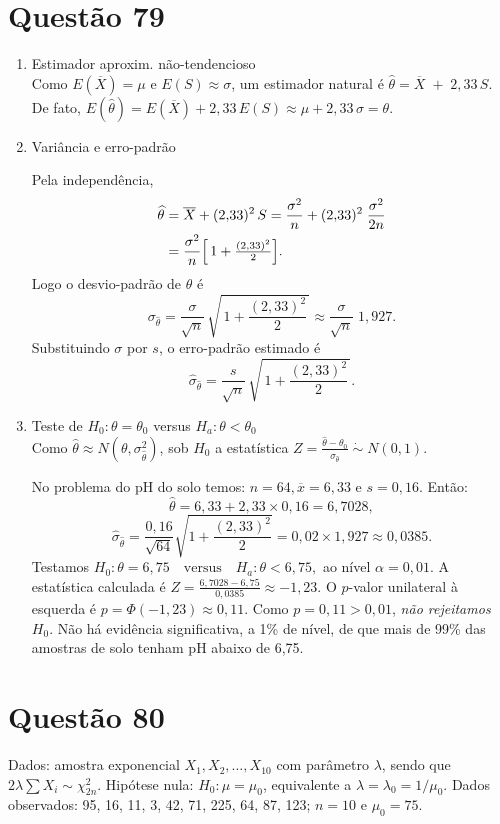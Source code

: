 \documentclass[12pt]{article}
\newcommand{\quest}[1]{\section*{Questão #1}} %
\begin{document}
\quest{79}
\begin{enumerate}
    \item Estimador aproxim. não-tendencioso\\
    Como $E(\overline X)=\mu$ e $E(S)\approx\sigma$, um estimador natural é
    $\widehat\theta =\overline X \;+\;2{,}33\,S.$
    De fato, $E(\widehat\theta) =E(\overline X)+2{,}33\,E(S) \approx\mu+2{,}33\,\sigma =\theta.$

    \item Variância e erro-padrão
    
    Pela independência,
    \begin{align*}
    \widehat\theta &=\overline X+(2{,}33)^2\,S =\frac{\sigma^2}{n}+(2{,}33)^2\;\frac{\sigma^2}{2n} \\ &=\frac{\sigma^2}{n}\Bigl[\,1+\tfrac{(2{,}33)^2}{2}\Bigr]. \end{align*}
    Logo o desvio-padrão de $\widehat\theta$ é
    $$\sigma_{\widehat\theta} =\frac{\sigma}{\sqrt n}\, \sqrt{\,1+\frac{(2{,}33)^2}{2}\,} \approx\frac{\sigma}{\sqrt n}\;1{,}927.$$
    Substituindo $\sigma$ por $s$, o erro-padrão estimado é
    $$\widehat\sigma_{\widehat\theta} =\frac{s}{\sqrt n}\, \sqrt{\,1+\frac{(2{,}33)^2}{2}\,}.$$

    \item Teste de $H_0:\theta=\theta_0$ versus $H_a:\theta<\theta_0$\\
    Como $\widehat\theta\approx N(\theta,\sigma_{\widehat\theta}^2)$, sob $H_0$ a estatística
    $Z =\frac{\widehat\theta-\theta_0}{\widehat\sigma_{\widehat\theta}} \;\dot{\sim}\;N(0,1).$
    
    No problema do pH do solo temos: $n=64, \overline x=6,33 \text{ e } s=0,16.$ Então:
    $$\widehat\theta =6{,}33+2{,}33\times0{,}16 =6{,}7028,$$
    $$\widehat\sigma_{\widehat\theta} =\frac{0{,}16}{\sqrt{64}} \sqrt{1+\frac{(2{,}33)^2}{2}} =0{,}02\times1{,}927 \approx0{,}0385.$$
    Testamos $H_0:\theta=6{,}75 \quad\text{versus}\quad H_a:\theta<6{,}75,$
    ao nível $\alpha=0,01$. A estatística calculada é $Z =\frac{6{,}7028 - 6{,}75}{0{,}0385} \approx -1{,}23.$
    O $p$-valor unilateral à esquerda é $p=\Phi(-1{,}23)\approx0{,}11.$
    Como $p=0{,}11>0{,}01$, \emph{não rejeitamos} $H_0$.  
    Não há evidência significativa, a 1\% de nível, de que mais de 99\% das amostras de solo tenham pH abaixo de 6,75.
\end{enumerate}

\quest{80}
Dados: amostra exponencial $X_1, X_2, \dots, X_{10}$ com parâmetro $\lambda$, sendo que $2\lambda \sum X_i \sim \chi^2_{2n}$. Hipótese nula: $H_0: \mu = \mu_0$, equivalente a $\lambda = \lambda_0 = 1/\mu_0$. Dados observados: 95, 16, 11, 3, 42, 71, 225, 64, 87, 123; $n=10$ e $\mu_0=75$.\\
\end{document}
